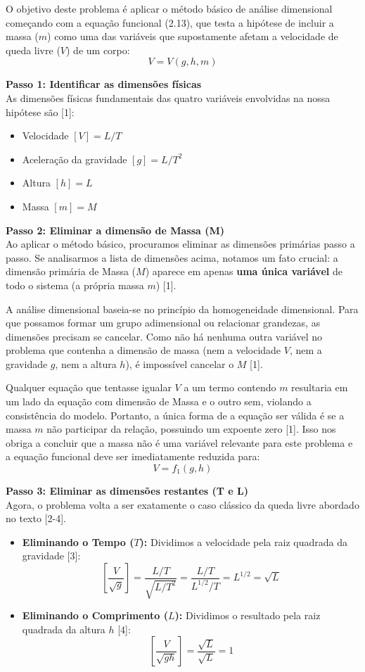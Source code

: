 O objetivo deste problema é aplicar o método básico de análise dimensional começando com a equação funcional (2.13), que testa a hipótese de incluir a massa ($m$) como uma das variáveis que supostamente afetam a velocidade de queda livre ($V$) de um corpo:
$$ V = V(g, h, m) $$

\vspace{0.3cm}
\textbf{Passo 1: Identificar as dimensões físicas} \\
As dimensões físicas fundamentais das quatro variáveis envolvidas na nossa hipótese são [1]:
\begin{itemize}
    \item Velocidade $[V] = L/T$
    \item Aceleração da gravidade $[g] = L/T^2$
    \item Altura $[h] = L$
    \item Massa $[m] = M$
\end{itemize}

\vspace{0.3cm}
\textbf{Passo 2: Eliminar a dimensão de Massa (M)} \\
Ao aplicar o método básico, procuramos eliminar as dimensões primárias passo a passo. Se analisarmos a lista de dimensões acima, notamos um fato crucial: a dimensão primária de Massa ($M$) aparece em apenas \textbf{uma única variável} de todo o sistema (a própria massa $m$) [1].

A análise dimensional baseia-se no princípio da homogeneidade dimensional. Para que possamos formar um grupo adimensional ou relacionar grandezas, as dimensões precisam se cancelar. Como não há nenhuma outra variável no problema que contenha a dimensão de massa (nem a velocidade $V$, nem a gravidade $g$, nem a altura $h$), é impossível cancelar o $M$ [1]. 

Qualquer equação que tentasse igualar $V$ a um termo contendo $m$ resultaria em um lado da equação com dimensão de Massa e o outro sem, violando a consistência do modelo. Portanto, a única forma de a equação ser válida é se a massa $m$ não participar da relação, possuindo um expoente zero [1]. Isso nos obriga a concluir que a massa não é uma variável relevante para este problema e a equação funcional deve ser imediatamente reduzida para:
$$ V = f_1(g, h) $$

\vspace{0.3cm}
\textbf{Passo 3: Eliminar as dimensões restantes (T e L)} \\
Agora, o problema volta a ser exatamente o caso clássico da queda livre abordado no texto [2-4].
\begin{itemize}
    \item \textbf{Eliminando o Tempo ($T$):} Dividimos a velocidade pela raiz quadrada da gravidade [3]: 
    $$ \left[ \frac{V}{\sqrt{g}} \right] = \frac{L/T}{\sqrt{L/T^2}} = \frac{L/T}{L^{1/2}/T} = L^{1/2} = \sqrt{L} $$
    \item \textbf{Eliminando o Comprimento ($L$):} Dividimos o resultado pela raiz quadrada da altura $h$ [4]: 
    $$ \left[ \frac{V}{\sqrt{gh}} \right] = \frac{\sqrt{L}}{\sqrt{L}} = 1 $$
\end{itemize}

